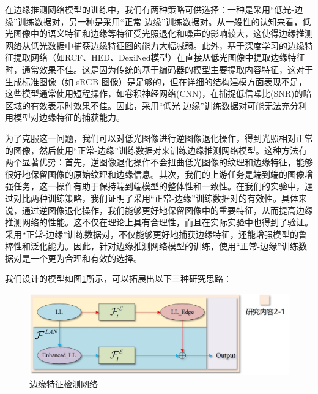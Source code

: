 \documentclass[a4paper]{ctexart}
\begin{document}
	在边缘推测网络模型的训练中，我们有两种策略可供选择：一种是采用“低光-边缘”训练数据对，另一种是采用“正常-边缘”训练数据对。从一般性的认知来看，低光图像中的语义特征和边缘等特征受光照退化和噪声的影响较大，这使得边缘推测网络从低光数据中捕获边缘特征图的能力大幅减弱。此外，基于深度学习的边缘特征提取网络（如RCF、HED、DexiNed模型）在直接从低光图像中提取边缘特征时，通常效果不佳。这是因为传统的基于编码器的模型主要提取内容特征，这对于生成标准图像（如 sRGB 图像）是足够的，但在详细的结构建模方面表现不足，这些模型通常使用短程操作，如卷积神经网络(CNN)，在捕捉低信噪比(SNR)的暗区域的有效表示时效果不佳。因此，采用“低光-边缘”训练数据对可能无法充分利用模型对边缘特征的捕获能力。
	
	为了克服这一问题，我们可以对低光图像进行逆图像退化操作，得到光照相对正常的图像，然后使用“正常-边缘”训练数据对来训练边缘推测网络模型。这种方法有两个显著优势：首先，逆图像退化操作不会扭曲低光图像的纹理和边缘特征，能够很好地保留图像的原始纹理和边缘信息。其次，我们的上游任务是端到端的图像增强任务，这一操作有助于保持端到端模型的整体性和一致性。在我们的实验中，通过对比两种训练策略，我们证明了采用“正常-边缘”训练数据对的有效性。具体来说，通过逆图像退化操作，我们能够更好地保留图像中的重要特征，从而提高边缘推测网络的性能。这不仅在理论上具有合理性，而且在实际实验中也得到了验证。采用“正常-边缘”训练数据对，不仅能够更好地捕获边缘特征，还能增强模型的鲁棒性和泛化能力。因此，针对边缘推测网络模型的训练，使用“正常-边缘”训练数据对是一个更为合理和有效的选择。
	
	我们设计的模型如图\ref{fig: DCMP}所示，可以拓展出以下三种研究思路：
	
	\begin{figure}[htbp]
		\centering
		\includegraphics[width=0.5\linewidth]{picture/Edge Detection/DCMP}
		\caption{边缘特征检测网络}
		\label{fig: DCMP}
	\end{figure}
	
\end{document}
